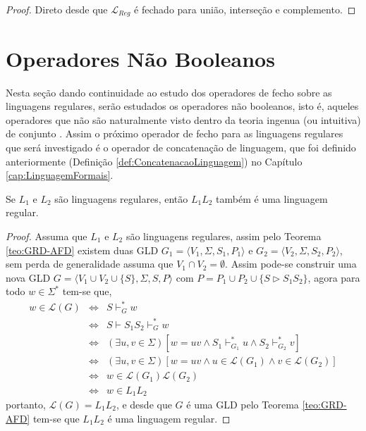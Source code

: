 \begin{proof}
	Direto desde que $\mathcal{L}_{Reg}$ é fechado para união, interseção e complemento.
\end{proof}

\section{Operadores Não Booleanos}

Nesta seção dando continuidade ao estudo dos operadores de fecho sobre as linguagens regulares, serão estudados os operadores não booleanos, isto é, aqueles operadores que não são naturalmente visto dentro da teoria ingenua (ou intuitiva) de conjunto \cite{abe1991-TC, lipschutz1978-TC}. Assim o próximo operador de fecho para as linguagens regulares que será investigado é o operador de concatenação de linguagem, que foi definido anteriormente (Definição \ref{def:ConcatenacaoLinguagem}) no Capítulo \ref{cap:LinguagemFormais}.

\begin{theorem}\label{teo:FechoConcatenacaoRegular}
	Se $L_1$ e $L_2$ são linguagens regulares, então $L_1L_2$ também é uma linguagem regular.
\end{theorem}

\begin{proof}
	Assuma que $L_1$ e $L_2$ são linguagens regulares, assim pelo Teorema \ref{teo:GRD-AFD} existem duas GLD $G_1 = \langle V_1, \Sigma, S_1, P_1 \rangle$ e $G_2 = \langle V_2, \Sigma, S_2, P_2 \rangle$, sem perda de generalidade assuma que $V_1 \cap V_2 = \emptyset$. Assim pode-se construir uma nova GLD $G = \langle V_1 \cup V_2 \cup \{S\}, \Sigma, S, P\rangle$ com $P = P_1 \cup P_2 \cup \{S \rhd S_1S_2\}$, agora para todo $w \in \Sigma^*$ tem-se que,
	\begin{eqnarray*}
		w \in \mathcal{L}(G) & \Longleftrightarrow & S \vdash^*_G w\\
		& \Longleftrightarrow & S \vdash S_1S_2 \vdash^*_G w\\
		& \Longleftrightarrow & (\exists u, v \in \Sigma)[w = uv \land S_1 \vdash^*_{G_1} u \land S_2 \vdash^*_{G_2} v]\\
		& \Longleftrightarrow & (\exists u, v \in \Sigma)[w = uv \land u \in \mathcal{L}(G_1) \land v \in \mathcal{L}(G_2)]\\
		& \Longleftrightarrow &  w \in \mathcal{L}(G_1) \mathcal{L}(G_2)\\
		& \Longleftrightarrow &  w \in L_1L_2
	\end{eqnarray*}
	portanto, $\mathcal{L}(G) = L_1L_2$, e desde que $G$ é uma GLD pelo Teorema \ref{teo:GRD-AFD} tem-se que $L_1L_2$ é uma linguagem regular.
\end{proof}

